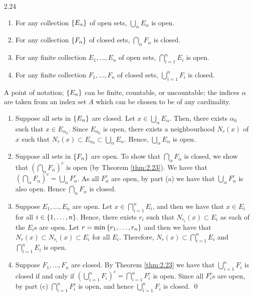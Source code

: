 \begin{theorem}{}{2.24}
    \begin{enumerate}
        \item For any collection $\set{E_\alpha}$ of open sets, $\bigcup_\alpha E_\alpha$ is open.
        \item For any collection $\set{F_\alpha}$ of closed sets, $\bigcap_\alpha F_\alpha$ is closed.
        \item For any finite collection $E_1, \ldots, E_n$ of open sets, $\bigcap_{i=1}^n E_i$ is open.
        \item For any finite collection $F_1, \ldots, F_n$ of closed sets, $\bigcup_{i=1}^n F_i$ is closed.
    \end{enumerate}
\end{theorem}
\noindent A point of notation; $\set{E_\alpha}$ can be finite, countable, or uncountable; the indices $\alpha$ are taken from an index set $A$ which can be chosen to be of any cardinality. 
\begin{nproof}
    \begin{enumerate}
        \item Suppose all sets in $\set{E_\alpha}$ are closed. Let $x \in \bigcup_{\alpha}E_\alpha$. Then, there exists $\alpha_0$ such that $x \in E_{\alpha_0}$. Since $E_{\alpha_0}$ is open, there exists a neighbourhood $N_r(x)$ of $x$ such that $N_r(x) \subset E_{\alpha_0} \subset \bigcup_{\alpha} E_\alpha$. Hence, $\bigcup_{\alpha} E_\alpha$ is open.
        \item Suppose all sets in $\set{F_\alpha}$ are open. To show that $\bigcap_\alpha F_\alpha$ is closed, we show that $\left(\bigcap_\alpha F_\alpha\right)^c$ is open (by Theorem \ref{thm:2.23}). We have that $\left(\bigcap_\alpha F_\alpha\right)^c = \bigcup_\alpha F_\alpha^c$. As all $F_\alpha^c$ are open, by part (a) we have that $\bigcup_\alpha F_\alpha^c$ is also open. Hence $\bigcap_\alpha F_\alpha$ is closed.
        \item Suppose $E_1,\ldots, E_n$ are open. Let $x \in \bigcap_{i=1}^n E_i$, and then we have that $x \in E_i$ for all $i \in \set{1, \ldots, n}$. Hence, there exists $r_i$ such that $N_{r_i}(x) \subset E_i$ as each of the $E_i$s are open. Let $r = \min\set{r_1, \ldots, r_n}$ and then we have that $N_r(x) \subset N_{r_i}(x) \subset E_i$ for all $E_i$. Therefore, $N_r(x) \subset \bigcap_{i=1}^n E_i$ and $\bigcap_{i=1}^n E_i$ is open.
        \item Suppose $F_1, \ldots, F_n$ are closed. By Theorem \ref{thm:2.23} we have that $\bigcup_{i=1}^n F_i$ is closed if and only if $\left(\bigcup_{i=1}^n F_i\right)^c = \bigcap_{i=1}^n F_i^c$ is open. Since all $F_i^c$s are open, by part (c) $\bigcap_{i=1}^n F_i^c$ is open, and hence $\bigcup_{i=1}^n F_i$ is closed. \qed
    \end{enumerate}
\end{nproof}

